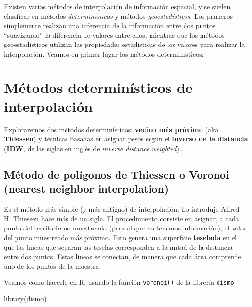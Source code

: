 \documentclass[
  letterpaper,
  DIV=11,
  numbers=noendperiod]{scrreprt}
\newenvironment{Shaded}{\begin{snugshade}}{\end{snugshade}}
\newcommand{\FunctionTok}[1]{\textcolor[rgb]{0.28,0.35,0.67}{#1}}
\newcommand{\NormalTok}[1]{\textcolor[rgb]{0.00,0.23,0.31}{#1}}
\begin{document}
Existen varios métodos de interpolación de información espacial, y se
suelen clasificar en métodos \emph{determinísticos} y métodos
\emph{geoestadísticos}. Los primeros simplemente realizan una inferencia
de la información entre dos puntos ``suavizando'' la diferencia de
valores entre ellos, mientras que los métodos geoestadísticos utilizan
las propiedades estadísticas de los valores para realizar la
interpolación. Veamos en primer lugar los métodos determinísticos:

\hypertarget{muxe9todos-determinuxedsticos-de-interpolaciuxf3n}{%
\section{Métodos determinísticos de
interpolación}\label{muxe9todos-determinuxedsticos-de-interpolaciuxf3n}}

Exploraremos dos métodos determinísticos: \textbf{vecino más próximo}
(aka \textbf{Thiessen}) y técnicas basadas en asignar pesos según el
\textbf{inverso de la distancia} (\textbf{IDW}, de las siglas en inglés
de \emph{inverse distance weighted}).

\hypertarget{muxe9todo-de-poluxedgonos-de-thiessen-o-voronoi-nearest-neighbor-interpolation}{%
\subsection{Método de polígonos de Thiessen o Voronoi (nearest neighbor
interpolation)}\label{muxe9todo-de-poluxedgonos-de-thiessen-o-voronoi-nearest-neighbor-interpolation}}

Es el método más simple (y más antiguo) de interpolación. Lo introdujo
Alfred H. Thiessen hace más de un siglo. El procedimiento consiste en
asignar, a cada punto del territorio no muestreado (para el que no
tenemos información), el valor del punto muestreado más próximo. Esto
genera una superficie \textbf{teselada} en el que las lineas que separan
las teselas corresponden a la mitad de la distancia entre dos puntos.
Estas líneas se conectan, de manera que cada área comprende uno de los
puntos de la muestra.

Veamos como hacerlo en R, usando la función \texttt{voronoi()} de la
librería \texttt{dismo}:

\begin{Shaded}
\begin{Highlighting}[]
\FunctionTok{library}\NormalTok{(dismo)}
\end{Highlighting}
\end{Shaded}
\end{document}
